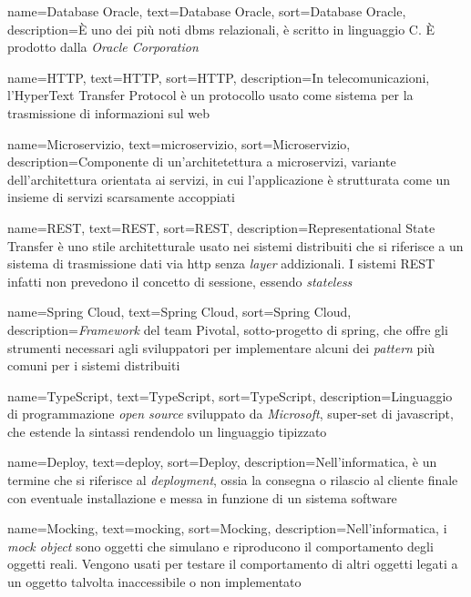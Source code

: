 {
    name=Database Oracle,
    text=Database Oracle,
    sort=Database Oracle,
    description={È uno dei più noti \gls{dbms} relazionali, è scritto in linguaggio C. È prodotto dalla \emph{Oracle Corporation}}
}

{
    name=HTTP,
    text=HTTP,
    sort=HTTP,
    description={In telecomunicazioni, l'HyperText Transfer Protocol è un protocollo usato come sistema per la trasmissione di informazioni sul web}
}

{
    name=Microservizio,
    text=microservizio,
    sort=Microservizio,
    description={Componente di un'architetettura a microservizi, variante dell'architettura orientata ai servizi, in cui l'applicazione è strutturata come un insieme di servizi scarsamente accoppiati}
}

{
    name=REST,
    text=REST,
    sort=REST,
    description={Representational State Transfer è uno stile architetturale usato nei sistemi distribuiti che si riferisce a un sistema di trasmissione dati via \acrshort{http} senza \emph{layer} addizionali. I sistemi REST infatti non prevedono il concetto di sessione, essendo \textit{stateless}}
}

{
    name=Spring Cloud,
    text=Spring Cloud,
    sort=Spring Cloud,
    description={\textit{Framework} del team Pivotal, sotto-progetto di \gls{spring}, che offre gli strumenti necessari agli sviluppatori per implementare alcuni dei \textit{pattern} più comuni per i sistemi distribuiti}
}

{
    name=TypeScript,
    text=TypeScript,
    sort=TypeScript,
    description={Linguaggio di programmazione \emph{open source} sviluppato da \emph{Microsoft}, super-set di \gls{javascript}, che estende la sintassi rendendolo un linguaggio tipizzato}
}

{
    name=Deploy,
    text=deploy,
    sort=Deploy,
    description={Nell'informatica, è un termine che si riferisce al \emph{deployment}, ossia la consegna o rilascio al cliente finale con eventuale installazione e messa in funzione di un sistema software}
}


{
    name=Mocking,
    text=mocking,
    sort=Mocking,
    description={Nell'informatica, i \emph{mock object} sono oggetti che simulano e riproducono il comportamento degli oggetti reali. Vengono usati per testare il comportamento di altri oggetti legati a un oggetto talvolta inaccessibile o non implementato}
}

